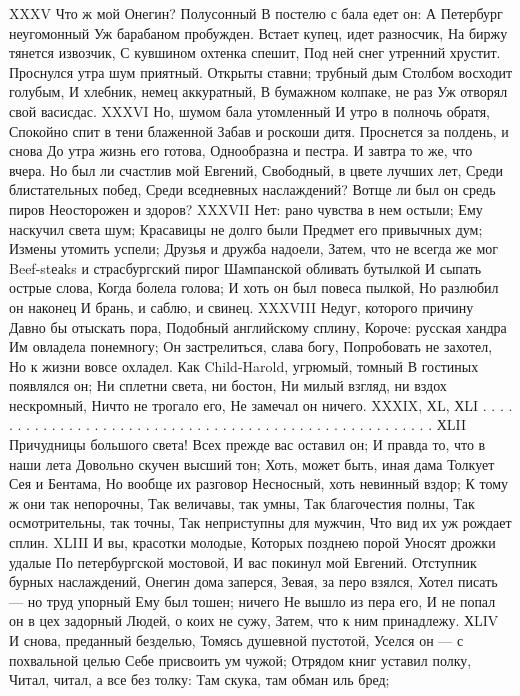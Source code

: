 XXXV
Что ж мой Онегин? Полусонный
В постелю с бала едет он:
А Петербург неугомонный
Уж барабаном пробужден.
Встает купец, идет разносчик,
На биржу тянется извозчик,
С кувшином охтенка спешит,
Под ней снег утренний хрустит.
Проснулся утра шум приятный.
Открыты ставни; трубный дым
Столбом восходит голубым,
И хлебник, немец аккуратный,
В бумажном колпаке, не раз
Уж отворял свой васисдас.
XXXVI
Но, шумом бала утомленный
И утро в полночь обратя,
Спокойно спит в тени блаженной
Забав и роскоши дитя.
Проснется за полдень, и снова
До утра жизнь его готова,
Однообразна и пестра.
И завтра то же, что вчера.
Но был ли счастлив мой Евгений,
Свободный, в цвете лучших лет,
Среди блистательных побед,
Среди вседневных наслаждений?
Вотще ли был он средь пиров
Неосторожен и здоров?
XXXVII
Нет: рано чувства в нем остыли;
Ему наскучил света шум;
Красавицы не долго были
Предмет его привычных дум;
Измены утомить успели;
Друзья и дружба надоели,
Затем, что не всегда же мог
Beef-stеаks и страсбургский пирог
Шампанской обливать бутылкой
И сыпать острые слова,
Когда болела голова;
И хоть он был повеса пылкой,
Но разлюбил он наконец
И брань, и саблю, и свинец.
XXXVIII
Недуг, которого причину
Давно бы отыскать пора,
Подобный английскому сплину,
Короче: русская хандра
Им овладела понемногу;
Он застрелиться, слава богу,
Попробовать не захотел,
Но к жизни вовсе охладел.
Как Child-Harold, угрюмый, томный
В гостиных появлялся он;
Ни сплетни света, ни бостон,
Ни милый взгляд, ни вздох нескромный,
Ничто не трогало его,
Не замечал он ничего.
XXXIX, ХL, ХLI
. . . . . . . . . . . . . . . . . .
. . . . . . . . . . . . . . . . . .
. . . . . . . . . . . . . . . . . .
ХLII
Причудницы большого света!
Всех прежде вас оставил он;
И правда то, что в наши лета
Довольно скучен высший тон;
Хоть, может быть, иная дама
Толкует Сея и Бентама,
Но вообще их разговор
Несносный, хоть невинный вздор;
К тому ж они так непорочны,
Так величавы, так умны,
Так благочестия полны,
Так осмотрительны, так точны,
Так неприступны для мужчин,
Что вид их уж рождает сплин.
XLIII
И вы, красотки молодые,
Которых позднею порой
Уносят дрожки удалые
По петербургской мостовой,
И вас покинул мой Евгений.
Отступник бурных наслаждений,
Онегин дома заперся,
Зевая, за перо взялся,
Хотел писать — но труд упорный
Ему был тошен; ничего
Не вышло из пера его,
И не попал он в цех задорный
Людей, о коих не сужу,
Затем, что к ним принадлежу.
ХLIV
И снова, преданный безделью,
Томясь душевной пустотой,
Уселся он — с похвальной целью
Себе присвоить ум чужой;
Отрядом книг уставил полку,
Читал, читал, а все без толку:
Там скука, там обман иль бред;
